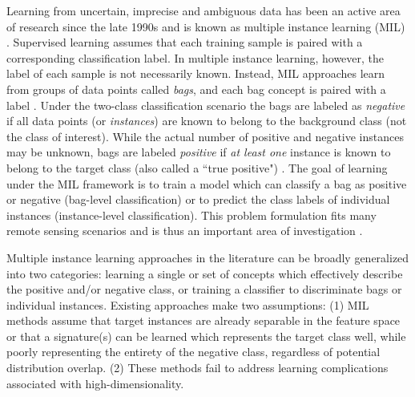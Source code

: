 Learning from uncertain, imprecise and ambiguous data has been an active area of research since the late 1990s and is known as multiple instance learning (MIL) \cite{Bocinsky2019Thesis}.  Supervised learning assumes that each training sample is paired with a corresponding classification label.  In multiple instance learning, however, the label of each sample is not necessarily known.  Instead, MIL approaches learn from groups of data points called \textit{bags}, and each bag concept is paired with a label \cite{Cook2015Thesis}. Under the two-class classification scenario the bags are labeled as \textit{negative} if all data points (or \textit{instances}) are known to belong to the background class (not the class of interest).  While the actual number of positive and negative instances may be unknown, bags are labeled \textit{positive} if \textit{at least one} instance is known to belong to the target class (also called a ``true positive") \cite{Zare2016MIACE}.  The goal of learning under the MIL framework is to train a model which can classify a bag as positive or negative (bag-level classification) or to predict the class labels of individual instances (instance-level classification). This problem formulation fits many remote sensing scenarios and is thus an important area of investigation \cite{Du2017Thesis}.  

Multiple instance learning approaches in the literature can be broadly generalized into two categories: learning a single or set of concepts which effectively describe the positive and/or negative class, or training a classifier to discriminate bags or individual instances.  Existing approaches make two assumptions:  (1) MIL methods assume that target instances are already separable in the feature space or that a signature(s) can be learned which represents the target class well, while poorly representing the entirety of the negative class, regardless of potential distribution overlap. (2) These methods fail to address learning complications associated with high-dimensionality.

